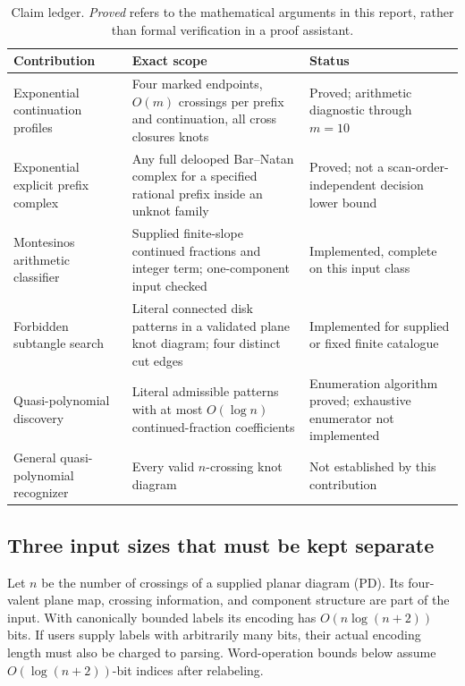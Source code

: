 \begin{table}[htbp]
\centering\small
\begin{tabularx}{\textwidth}{L{0.25\textwidth}X L{0.21\textwidth}}
\toprule
Contribution & Exact scope & Status\\
\midrule
Exponential continuation profiles &
Four marked endpoints, \(O(m)\) crossings per prefix and continuation,
all cross closures knots &
Proved; arithmetic diagnostic through \(m=10\)\\
\addlinespace
Exponential explicit prefix complex &
Any full delooped Bar--Natan complex for a specified rational prefix
inside an unknot family &
Proved; not a scan-order-independent decision lower bound\\
\addlinespace
Montesinos arithmetic classifier &
Supplied finite-slope continued fractions and integer term; one-component
input checked &
Implemented, complete on this input class\\
\addlinespace
Forbidden subtangle search &
Literal connected disk patterns in a validated plane knot diagram;
four distinct cut edges &
Implemented for supplied or fixed finite catalogue\\
\addlinespace
Quasi-polynomial discovery &
Literal admissible patterns with at most \(O(\log n)\) continued-fraction
coefficients &
Enumeration algorithm proved; exhaustive enumerator not implemented\\
\addlinespace
General quasi-polynomial recognizer &
Every valid \(n\)-crossing knot diagram &
Not established by this contribution\\
\bottomrule
\end{tabularx}
\caption{Claim ledger. \emph{Proved} refers to the mathematical arguments in
this report, rather than formal verification in a proof assistant.}
\label{tab:claims}
\end{table}

\subsection{Three input sizes that must be kept separate}
\label{subsec:input-sizes}

Let \(n\) be the number of crossings of a supplied planar diagram (PD).
Its four-valent plane map, crossing information, and component structure
are part of the input. With canonically bounded labels its encoding has
\(O(n\log(n+2))\) bits. If users supply labels with arbitrarily many bits,
their actual encoding length must also be charged to parsing. Word-operation
bounds below assume \(O(\log(n+2))\)-bit indices after relabeling.

